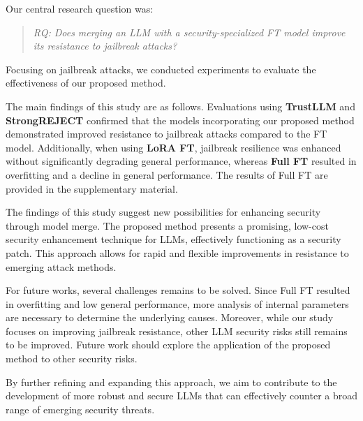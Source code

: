\documentclass[conference,compsoc]{IEEEtran}
\begin{document}
Our central research question was:
\begin{quote}
\textit{RQ: Does merging an LLM with a security-specialized FT model improve its resistance to jailbreak attacks?}
\end{quote}
Focusing on jailbreak attacks, we conducted experiments to evaluate the effectiveness of our proposed method.

The main findings of this study are as follows. Evaluations using \textbf{TrustLLM} and \textbf{StrongREJECT} confirmed that the models incorporating our proposed method demonstrated improved resistance to jailbreak attacks compared to the FT model. Additionally, when using \textbf{LoRA FT}, jailbreak resilience was enhanced without significantly degrading general performance, whereas \textbf{Full FT} resulted in overfitting and a decline in general performance. The results of Full FT are provided in the supplementary material.

The findings of this study suggest new possibilities for enhancing security through model merge. The proposed method presents a promising, low-cost security enhancement technique for LLMs, effectively functioning as a security patch. This approach allows for rapid and flexible improvements in resistance to emerging attack methods.

For future works, several challenges remains to be solved. Since Full FT resulted in overfitting and low general performance, more analysis of internal parameters are necessary to determine the underlying causes. Moreover, while our study focuses on improving jailbreak resistance, other LLM security risks still remains to be improved. Future work should explore the application of the proposed method to other security risks.

By further refining and expanding this approach, we aim to contribute to the development of more robust and secure LLMs that can effectively counter a broad range of emerging security threats.

\end{document}
